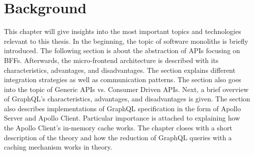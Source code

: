 \chapter{Background}\label{chapter:background}

This chapter will give insights into the most important topics and technologies relevant to this thesis. In the beginning, the topic of software monoliths is briefly introduced. The following section is about the abstraction of \acp{API} focusing on \acp{BFF}. Afterwards, the micro-frontend architecture is described with its characteristics, advantages, and disadvantages. The section explains different integration strategies as well as communication patterns. The section also goes into the topic of Generic \acp{API} vs. Consumer Driven \acp{API}. Next, a brief overview of GraphQL's characteristics, advantages, and disadvantages is given. The section also describes implementations of GraphQL specification in the form of Apollo Server and Apollo Client. Particular importance is attached to explaining how the Apollo Client's in-memory cache works. The chapter closes with a short description of the theory and how the reduction of GraphQL queries with a caching mechanism works in theory.









